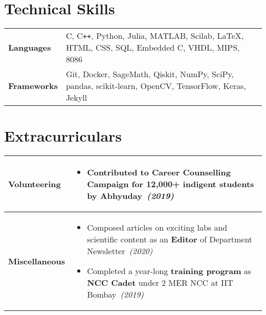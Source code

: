 \documentclass[10pt, a4paper]{article}
\newcommand{\rhsmall}[1]{\hfill{\footnotesize{\textsl{(#1)}}}}
\begin{document}
\section{Technical Skills}
\setlength\tabcolsep{0.3em}
\vspace{-0.3em}
\hspace{-5pt}
\begin{tabular}{p{1.15in}p{5.85in}}
\textbf{Languages}& C, C\texttt{++}, Python, Julia, MATLAB, Scilab, \LaTeX, HTML, CSS,  SQL, Embedded C, VHDL, MIPS, 8086\\%
\textbf{Frameworks}& Git, Docker, SageMath, Qiskit, NumPy, SciPy, pandas, scikit-learn, OpenCV, TensorFlow, Keras, Jekyll\\%
\end{tabular}
\section{Extracurriculars}
\vspace{-0.5em}
\begin{tabular}{p{0.99in}p{6.01in}}
\vspace{-0.5em}
\small\textbf{Volunteering} & \vspace{-0.5em}%
\begin{itemize}
	\item Contributed to Career Counselling Campaign for 12,000+ indigent students by \textbf{Abhyuday}\ \rhsmall{2019}
\end{itemize}\\[-1em]\hline
\vspace{-0.5em}
\small\textbf{Miscellaneous}	& \vspace{-0.5em}
\begin{itemize}
	\item Composed articles on exciting labs and scientific content as an \textbf{Editor} of Department Newsletter\ \rhsmall{2020}%
	\item Completed a year-long \textbf{training program} as \textbf{NCC Cadet} under 2 MER NCC at IIT Bombay\ \rhsmall{2019}%
\end{itemize}%
\end{tabular}
\end{document}
